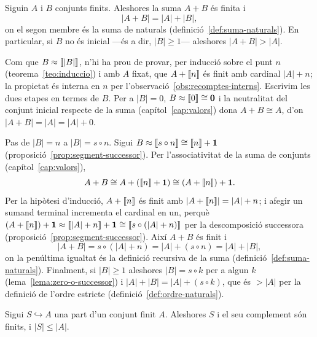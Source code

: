 \begin{lema}\label{lema:recompte-suma}
Siguin \(A\) i \(B\) conjunts finits. Aleshores la suma \(A+B\) és finita i
\[
|A+B|=|A|+|B|,
\]
on el segon membre és la suma de naturals (definició~\ref{def:suma-naturals}).
En particular, si \(B\) no és inicial ---és a dir, \(|B|\ge 1\)--- aleshores
\(|A+B|>|A|\).
\end{lema}

\begin{prova}
Com que \(B\approx\llbracket |B|\rrbracket\), n'hi ha prou de provar, per inducció sobre
el punt \(n\) (teorema~\ref{teo:induccio}) i amb \(A\) fixat, que
\(A+\llbracket n\rrbracket\) és finit amb cardinal \(|A|+n\); la propietat és interna en
\(n\) per l'observació~\ref{obs:recomptes-interns}. Escrivim les dues
etapes en termes de \(B\). Per a \(|B|=0\), \(B\approx\llbracket 0\rrbracket\cong\mathbf0\)
i la neutralitat del conjunt inicial respecte de la suma
(capítol~\ref{cap:valors}) dona \(A+B\cong A\), d'on
\(|A+B|=|A|=|A|+0\).

Pas de \(|B|=n\) a \(|B|=s\circ n\). Sigui \(B\approx\llbracket s\circ
n\rrbracket\cong\llbracket n\rrbracket+\mathbf1\) (proposició~\ref{prop:segment-successor}). Per
l'associativitat de la suma de conjunts (capítol~\ref{cap:valors}),
\[
A+B\cong A+(\llbracket n\rrbracket+\mathbf1)\cong (A+\llbracket n\rrbracket)+\mathbf1 .
\]
Per la hipòtesi d'inducció, \(A+\llbracket n\rrbracket\) és finit amb
\(|A+\llbracket n\rrbracket|=|A|+n\); i afegir un sumand terminal incrementa el cardinal
en un, perquè \((A+\llbracket n\rrbracket)+\mathbf1\approx\llbracket |A|+n\rrbracket+\mathbf1\cong
\llbracket s\circ(|A|+n)\rrbracket\) per la descomposició successora
(proposició~\ref{prop:segment-successor}). Així \(A+B\) és finit i
\[
|A+B|=s\circ(|A|+n)=|A|+(s\circ n)=|A|+|B|,
\]
on la penúltima igualtat és la definició recursiva de la suma
(definició~\ref{def:suma-naturals}). Finalment, si \(|B|\ge1\) aleshores
\(|B|=s\circ k\) per a algun \(k\) (lema~\ref{lema:zero-o-successor}) i
\(|A|+|B|=|A|+(s\circ k)\), que és \(>|A|\) per la definició de l'ordre
estricte (definició~\ref{def:ordre-naturals}).
\end{prova}

\begin{lema}\label{lema:part-finita}
Sigui \(S\hookrightarrow A\) una part d'un conjunt finit \(A\). Aleshores
\(S\) i el seu complement són finits, i \(|S|\le|A|\).
\end{lema}

